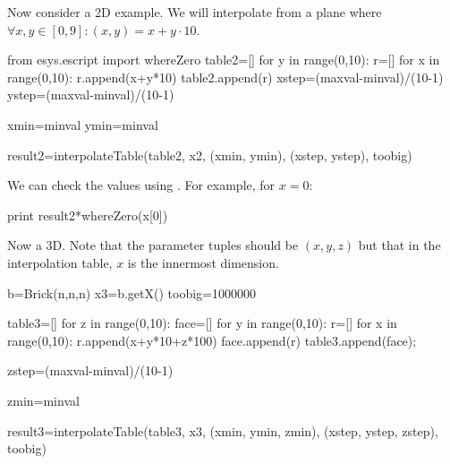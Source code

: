 Now consider a 2D example. We will interpolate from a plane where $\forall x,y\in[0,9]:(x,y)=x+y\cdot10$.

\begin{python}
from esys.escript import whereZero
table2=[]
for y in range(0,10):
      r=[]
      for x in range(0,10):
	 r.append(x+y*10)
      table2.append(r)
xstep=(maxval-minval)/(10-1)
ystep=(maxval-minval)/(10-1)

xmin=minval
ymin=minval

result2=interpolateTable(table2, x2, (xmin, ymin), (xstep, ystep), toobig)
\end{python}

We can check the values using .
For example, for $x=0$:
\begin{python}
print result2*whereZero(x[0]) 
\end{python}

Now a 3D. Note that the parameter tuples should be $(x,y,z)$ but that in the interpolation table, $x$ is the innermost dimension.
\begin{python}
b=Brick(n,n,n)
x3=b.getX()
toobig=1000000

table3=[]
for z in range(0,10):
   face=[]
   for y in range(0,10):
      r=[]
      for x in range(0,10):
	 r.append(x+y*10+z*100)
      face.append(r)
   table3.append(face);

zstep=(maxval-minval)/(10-1)

zmin=minval

result3=interpolateTable(table3, x3, (xmin, ymin, zmin), (xstep, ystep, zstep), toobig)
\end{python}

% 
% 
% 
% 
% 
% 

